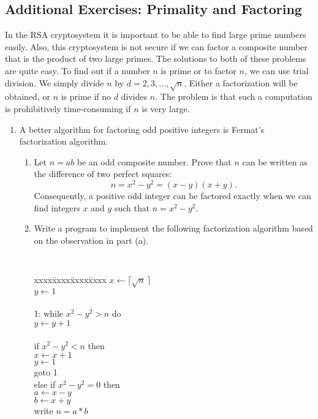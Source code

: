  
\subsection*{Additional Exercises: Primality and Factoring}
 
{\small 
 
 
In the RSA cryptosystem it is important to be able to find
large prime numbers easily.  Also, this cryptosystem is not secure if we
can factor a composite number that is the product of two large primes.
The solutions to both of these problems are quite easy.  To
find out if a number $n$ is prime or to factor $n$, we can use trial
division. We simply divide $n$ by $d = 2, 3, \ldots, \sqrt{n}$.
Either a factorization will be obtained, or $n$ is prime if no $d$
divides $n$.  The problem is that such a computation is prohibitively
time-consuming if $n$ is very large. 
\begin{enumerate}
 
 
\item
A better algorithm for factoring odd positive integers is {\bfi
Fermat's factorization algorithm}. 
\begin{enumerate}
 
\item
Let $n= ab$ be an odd composite number. Prove that $n$ can be written
as the difference of two perfect squares:
\[
n = x^2 - y^2 = (x-y)(x+y).
\]
Consequently, a positive odd integer can be factored exactly when we
can find integers $x$ and $y$ such that $n = x^2 - y^2$.
 
\item
Write a program to implement the following factorization algorithm
based on the observation in part (a).
 
\medskip
 
{\tt
\begin{tabbing}
xxxx\=xxxx\=xxxx\=xxxx \kill
\> $x \leftarrow \lceil \sqrt{n}\, \rceil$ \\
\> $y \leftarrow 1$ \\
\mbox{\hspace*{1in}} \\
1: \> while $x^2 - y^2 > n$ do \\
\> \> $y \leftarrow y + 1$ \\
\mbox{\hspace*{1in}} \\
\> if $x^2 - y^2 < n$ then \\
\> \>  $x \leftarrow x + 1$ \\
\> \>  $y \leftarrow 1$ \\
\> \>  goto 1 \\
\> else if $x^2 - y^2 = 0$ then \\
\>  \> $a \leftarrow x-y$ \\
\>  \> $b \leftarrow x+y$ \\
\>  \> write $n = a * b$ 
\end{tabbing}
 
}
\end{enumerate}
\end{enumerate}}
